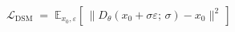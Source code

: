 \documentclass[border=10pt,varwidth=\maxdimen]{standalone}
\begin{document}
\(\displaystyle \mathcal{L}_{\mathrm{DSM}} \;=\; \mathbb{E}_{x_0,\varepsilon}\!\left[\,\big\lVert D_\theta(x_0 + \sigma\varepsilon;\,\sigma) - x_0 \big\rVert^2\,\right] \)
\end{document}
